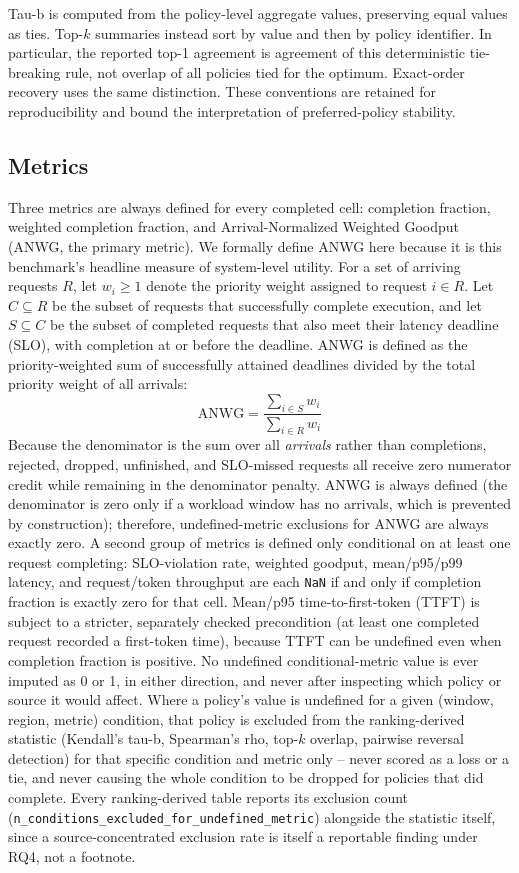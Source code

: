Tau-b is computed from the policy-level aggregate values, preserving equal
values as ties. Top-$k$ summaries instead sort by value and then by policy
identifier. In particular, the reported top-1 agreement is agreement of
this deterministic tie-breaking rule, not overlap of all policies tied
for the optimum. Exact-order recovery uses the same distinction. These
conventions are retained for reproducibility and bound the interpretation
of preferred-policy stability.
\subsection{Metrics}
\label{sec:metrics}

Three metrics are always defined for every completed cell: completion
fraction, weighted completion fraction, and Arrival-Normalized Weighted Goodput (ANWG, the primary metric). We formally define ANWG here because it is this benchmark's headline measure of system-level utility. For a set of arriving requests $R$, let $w_i \ge 1$ denote the priority weight assigned to request $i \in R$. Let $C \subseteq R$ be the subset of requests that successfully complete execution, and let $S \subseteq C$ be the subset of completed requests that also meet their latency deadline (SLO), with completion at or before the deadline. ANWG is defined as the priority-weighted sum of successfully attained deadlines divided by the total priority weight of all arrivals:
\begin{equation}
\text{ANWG} = \frac{\sum_{i \in S} w_i}{\sum_{i \in R} w_i}
\end{equation}
Because the denominator is the sum over all \emph{arrivals} rather than completions, rejected, dropped, unfinished, and SLO-missed requests all receive zero numerator credit while remaining in the denominator penalty. ANWG is always defined (the denominator is zero only if a workload window has no arrivals, which is prevented by construction); therefore, undefined-metric exclusions for ANWG are always exactly zero. A second group of metrics is defined
only conditional on at least one request completing: SLO-violation rate,
weighted goodput, mean/p95/p99 latency, and request/token throughput are
each \texttt{NaN} if and only if completion fraction is exactly zero for
that cell. Mean/p95 time-to-first-token (TTFT) is subject to a stricter,
separately checked precondition (at least one completed request recorded a
first-token time), because TTFT can be undefined even when completion
fraction is positive. No undefined conditional-metric value is ever imputed
as 0 or 1, in either direction, and never after inspecting which policy or
source it would affect. Where a policy's value is undefined for a given
(window, region, metric) condition, that policy is excluded from the
ranking-derived statistic (Kendall's tau-b, Spearman's rho, top-$k$
overlap, pairwise reversal detection) for that specific condition and
metric only -- never scored as a loss or a tie, and never causing the whole
condition to be dropped for policies that did complete. Every
ranking-derived table reports its exclusion count
(\texttt{n\_conditions\_excluded\_for\_undefined\_metric}) alongside the
statistic itself, since a source-concentrated exclusion rate is itself a
reportable finding under RQ4, not a footnote.


